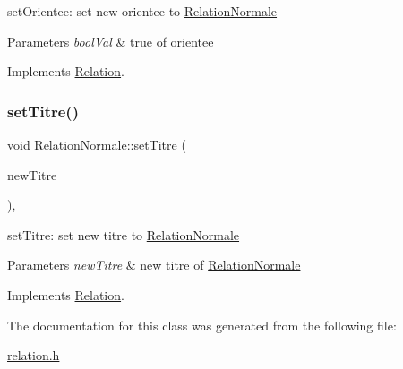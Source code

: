 set\+Orientee\+: set new orientee to \hyperlink{class_relation_normale}{Relation\+Normale} 


\begin{DoxyParams}{Parameters}
{\em bool\+Val} & true of orientee \\
\hline
\end{DoxyParams}


Implements \hyperlink{class_relation_a5c93cf0ba3f16e75b83f3683b5ac26ec}{Relation}.

\mbox{\label{class_relation_normale_abd0076a23f702ced9af181a0f046652c}} 
\subsubsection{\texorpdfstring{set\+Titre()}{setTitre()}}
{\footnotesize\ttfamily void Relation\+Normale\+::set\+Titre (\begin{DoxyParamCaption}\item[{const Q\+String \&}]{new\+Titre }\end{DoxyParamCaption})\hspace{0.3cm}{\ttfamily [inline]}, {\ttfamily [virtual]}}



set\+Titre\+: set new titre to \hyperlink{class_relation_normale}{Relation\+Normale} 


\begin{DoxyParams}{Parameters}
{\em new\+Titre} & new titre of \hyperlink{class_relation_normale}{Relation\+Normale} \\
\hline
\end{DoxyParams}


Implements \hyperlink{class_relation_a1c08a802796f5fccaa5732ec1a96e542}{Relation}.



The documentation for this class was generated from the following file\+:\begin{DoxyCompactItemize}
\item 
\hyperlink{relation_8h}{relation.\+h}\end{DoxyCompactItemize}
